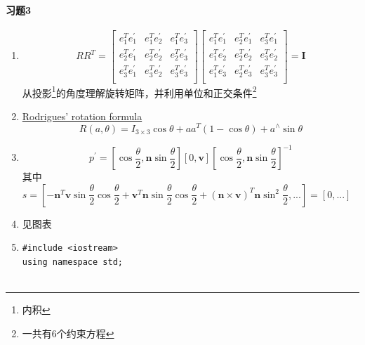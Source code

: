 \documentclass[12pt,a4paper]{ctexart}
\begin{document}
\paragraph{习题3}
\begin{enumerate}
	\item 
	\begin{equation}\label{key}
	RR^{T}=
	\begin{bmatrix}
	e_{1}^{T}e_{1}^{\prime} & e_{1}^{T}e_{2}^{\prime} & e_{1}^{T}e_{3}^{\prime}\\
	e_{2}^{T}e_{1}^{\prime} & e_{2}^{T}e_{2}^{\prime} & e_{2}^{T}e_{3}^{\prime}\\
	e_{3}^{T}e_{1}^{\prime} & e_{3}^{T}e_{2}^{\prime} & e_{3}^{T}e_{3}^{\prime}\\
	\end{bmatrix}
	\begin{bmatrix}
	e_{1}^{T}e_{1}^{\prime} & e_{2}^{T}e_{1}^{\prime} & e_{3}^{T}e_{1}^{\prime}\\
	e_{1}^{T}e_{2}^{\prime} & e_{2}^{T}e_{2}^{\prime} & e_{3}^{T}e_{2}^{\prime}\\
	e_{1}^{T}e_{3}^{\prime} & e_{2}^{T}e_{3}^{\prime} & e_{3}^{T}e_{3}^{\prime}\\
	\end{bmatrix}
	=
	\textbf{I}
	\end{equation}
	从投影\footnote{内积}的角度理解旋转矩阵，并利用单位和正交条件\footnote{一共有6个约束方程}
	
	\item \href{https://en.wikipedia.org/wiki/Rodrigues%27_rotation_formula}{Rodrigues' rotation formula}\\
		\begin{equation}\label{key}
		R(a,\theta)=I_{3 \times 3}\cos \theta +aa^{T}(1-\cos \theta)+a^{\wedge} \sin \theta
		\end{equation}
		\begin{figure}
			\centering
			\caption{}
			\label{fig:rodrigues}
		\end{figure}
		\item 
		\begin{equation}\label{key}
		p^{\prime} = [\cos \dfrac{\theta}{2},\textbf{n}\sin \dfrac{\theta}{2}][0, \textbf{v}][\cos \dfrac{\theta}{2},\textbf{n}\sin \dfrac{\theta}{2}]^{-1}
		\end{equation}
		其中$ s = [-\textbf{n}^{T}\textbf{v}\sin \dfrac{\theta}{2}\cos \dfrac{\theta}{2}+\textbf{v}^{T}\textbf{n}\sin \dfrac{\theta}{2}\cos \dfrac{\theta}{2}+(\textbf{n}\times \textbf{v})^{T}\textbf{n}\sin^{2} \dfrac{\theta}{2}, ...] = [0, ...]$
		\item 见图表
		\item 
\lstset{language=C++}
\begin{lstlisting}
#include <iostream>
using namespace std;


\end{lstlisting}
\end{enumerate}
\end{document}
